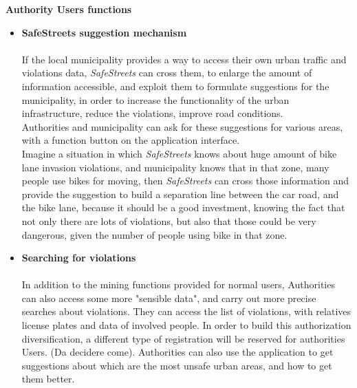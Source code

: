     \textbf{Authority Users functions} \\
    
    \begin{itemize}
   
    
    \item\textbf{SafeStreets suggestion mechanism}\\\\
    If the local municipality provides a way to access their own urban traffic and violations data, \textit{SafeStreets} can cross them, to enlarge the amount of information accessible, and exploit them to formulate suggestions for the municipality, in order to increase the functionality of the urban infrastructure, reduce the violations, improve road conditions.\\ Authorities and municipality can ask for these suggestions for various areas, with a function button on the application interface.\\
    Imagine a situation in which \textit{SafeStreets} knows about huge amount of bike lane invasion violations, and municipality knows that in that zone, many people use bikes for moving, then \textit{SafeStreets} can cross those information and provide the suggestion to build a separation line between the car road, and the bike lane, because it should be a good investment, knowing the fact that not only there are lots of violations, but also that those could be very dangerous, given the number of people using bike in that zone. 
    
    
     
    \item\textbf{Searching for violations}\\\\
    In addition to the mining functions provided for normal users, Authorities can also access some more "sensible data", and carry out more precise searches about violations. They can access the list of violations, with relatives license plates and data of involved people. In order to build this authorization diversification, a different type of registration will be reserved for authorities Users. (Da decidere come).
    Authorities can also use the application to get suggestions about which are the most unsafe urban areas, and how to get them better.
    

\end{itemize}
